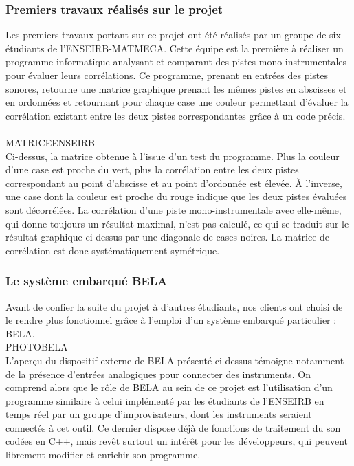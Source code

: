 \documentclass{article}
\begin{document}
\subsubsection{Premiers travaux réalisés sur le projet}
Les premiers travaux portant sur ce projet ont été réalisés par un groupe de six étudiants de l'ENSEIRB-MATMECA. Cette équipe est la première à réaliser un programme informatique analysant et comparant des pistes mono-instrumentales pour évaluer leurs corrélations. Ce programme, prenant en entrées des pistes sonores, retourne une matrice graphique prenant les mêmes pistes en abscisses et en ordonnées et retournant pour chaque case une couleur permettant d'évaluer la corrélation existant entre les deux pistes correspondantes grâce à un code précis. \\
\\
MATRICEENSEIRB \\
Ci-dessus, la matrice obtenue à l'issue d'un test du programme. Plus la couleur d'une case est proche du vert, plus la corrélation entre les deux pistes correspondant au point d'abscisse et au point d'ordonnée est élevée. À l'inverse, une case dont la couleur est proche du rouge indique que les deux pistes évaluées sont décorrélées. La corrélation d'une piste mono-instrumentale avec elle-même, qui donne toujours un résultat maximal, n'est pas calculé, ce qui se traduit sur le résultat graphique ci-dessus par une diagonale de cases noires. La matrice de corrélation est donc systématiquement symétrique.

\subsubsection{Le système embarqué BELA}
Avant de confier la suite du projet à d'autres étudiants, nos clients ont choisi de le rendre plus fonctionnel grâce à l'emploi d'un système embarqué particulier : BELA. \\
PHOTOBELA \\
L'aperçu du dispositif externe de BELA présenté ci-dessus témoigne notamment de la présence d'entrées analogiques pour connecter des instruments. On comprend alors que le rôle de BELA au sein de ce projet est l'utilisation d'un programme similaire à celui implémenté par les étudiants de l'ENSEIRB en temps réel par un groupe d'improvisateurs, dont les instruments seraient connectés à cet outil. Ce dernier dispose déjà de fonctions de traitement du son codées en C++, mais revêt surtout un intérêt pour les développeurs, qui peuvent librement modifier et enrichir son programme.
\end{document}
